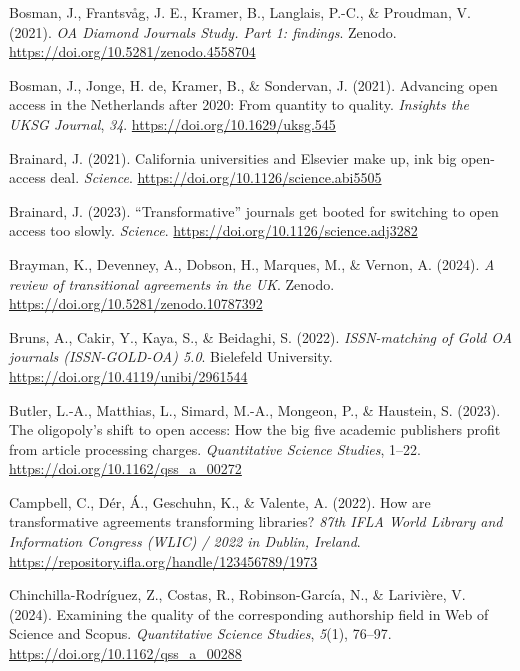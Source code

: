 \documentclass[a4paper,man,floatsintext,longtable,noextraspace,12pt]{apa6}
\newlength{\cslhangindent}
\newenvironment{CSLReferences}[2] %
  {\begin{list}{}{%
   \setlength{\itemindent}{0pt}
   \setlength{\leftmargin}{0pt}
   \setlength{\parsep}{0pt}
   \ifodd #1
    \setlength{\leftmargin}{\cslhangindent}
    \setlength{\itemindent}{-1\cslhangindent}
   \fi
   \setlength{\itemsep}{#2\baselineskip}}}
  {\end{list}}
\begin{document}
\begin{CSLReferences}{1}{0}
Bosman, J., Frantsvåg, J. E., Kramer, B., Langlais, P.-C., \& Proudman,
V. (2021). \emph{{OA Diamond Journals Study}. Part 1: findings}. Zenodo.
\url{https://doi.org/10.5281/zenodo.4558704}

Bosman, J., Jonge, H. de, Kramer, B., \& Sondervan, J. (2021). Advancing
open access in the {Netherlands} after 2020: From quantity to quality.
\emph{Insights the UKSG Journal}, \emph{34}.
\url{https://doi.org/10.1629/uksg.545}

Brainard, J. (2021). California universities and {Elsevier} make up, ink
big open-access deal. \emph{Science}.
\url{https://doi.org/10.1126/science.abi5505}

Brainard, J. (2023). {``Transformative''} journals get booted for
switching to open access too slowly. \emph{Science}.
\url{https://doi.org/10.1126/science.adj3282}

Brayman, K., Devenney, A., Dobson, H., Marques, M., \& Vernon, A.
(2024). \emph{A review of transitional agreements in the {UK}}. Zenodo.
\url{https://doi.org/10.5281/zenodo.10787392}

Bruns, A., Cakir, Y., Kaya, S., \& Beidaghi, S. (2022).
\emph{{ISSN-matching of Gold OA journals (ISSN-GOLD-OA) 5.0}}. Bielefeld
University. \url{https://doi.org/10.4119/unibi/2961544}

Butler, L.-A., Matthias, L., Simard, M.-A., Mongeon, P., \& Haustein, S.
(2023). The oligopoly's shift to open access: How the big five academic
publishers profit from article processing charges. \emph{Quantitative
Science Studies}, 1--22. \url{https://doi.org/10.1162/qss_a_00272}

Campbell, C., Dér, Á., Geschuhn, K., \& Valente, A. (2022). How are
transformative agreements transforming libraries? \emph{87th IFLA World
Library and Information Congress (WLIC) / 2022 in Dublin, Ireland}.
\url{https://repository.ifla.org/handle/123456789/1973}

Chinchilla-Rodríguez, Z., Costas, R., Robinson-García, N., \& Larivière,
V. (2024). Examining the quality of the corresponding authorship field
in {Web of Science} and {Scopus}. \emph{Quantitative Science Studies},
\emph{5}(1), 76--97. \url{https://doi.org/10.1162/qss_a_00288}


\end{CSLReferences}
\end{document}
